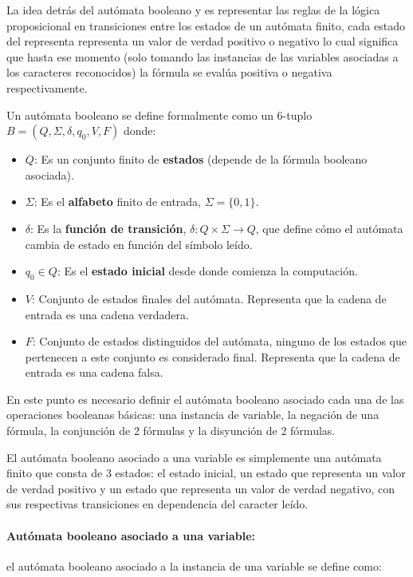 \documentclass[12pt]{article}
\begin{document}
La idea detrás del autómata booleano y es representar las reglas de la lógica proposicional en transiciones entre los estados de un autómata finito,
cada estado del representa representa un valor de verdad positivo o negativo lo cual significa que hasta ese momento (solo tomando las instancias de 
las variables asociadas a los caracteres reconocidos) la fórmula se evalúa positiva o negativa respectivamente.   

Un autómata booleano \cite{aCFSAT} se define formalmente como un 6-tuplo $B=(Q,\Sigma,\delta,q_0,V,F)$ donde:

\begin{itemize}
      \item $Q$: Es un conjunto finito de \textbf{estados} (depende de la fórmula booleano asociada).
      \item $\Sigma$: Es el \textbf{alfabeto} finito de entrada, $\Sigma =\{0,1\}$.
      \item $\delta$: Es la \textbf{función de transición}, $\delta: Q \times \Sigma \to Q$, que define cómo el autómata cambia de estado en función del símbolo leído.
      \item $q_0 \in Q$: Es el \textbf{estado inicial} desde donde comienza la computación.
      \item  $V$: Conjunto de estados finales del autómata. Representa que la cadena de entrada es una cadena verdadera.
      \item  $F$: Conjunto de estados distinguidos del autómata, ninguno de los estados que pertenecen a este conjunto es considerado final.
            Representa que la cadena de entrada es una cadena falsa.
            
\end{itemize}

En este punto es necesario definir el autómata booleano asociado cada una de las operaciones booleanas básicas: una instancia de 
variable, la negación de una fórmula, la conjunción de 2 fórmulas y la disyunción de 2 fórmulas.

El autómata booleano asociado a una variable es simplemente una autómata finito que consta de 3 estados: el estado inicial, un estado
que representa un valor de verdad positivo y un estado que representa un valor de verdad negativo, con sus respectivas transiciones en
dependencia del caracter leído.

\paragraph{Autómata booleano asociado a una variable:} el autómata booleano asociado a la instancia de una variable
se define como:
\end{document}
